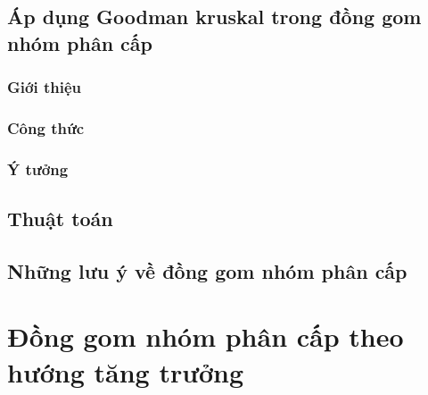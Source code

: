 	\subsection{Áp dụng Goodman kruskal trong đồng gom nhóm phân cấp}
	
		\subsubsection{Giới thiệu}		
		
		\subsubsection{Công thức}
		
		\subsubsection{Ý tưởng}
	\subsection{Thuật toán}
	
	\subsection{Những lưu ý về đồng gom nhóm phân cấp}
		
\section{Đồng gom nhóm phân cấp theo hướng tăng trưởng}


